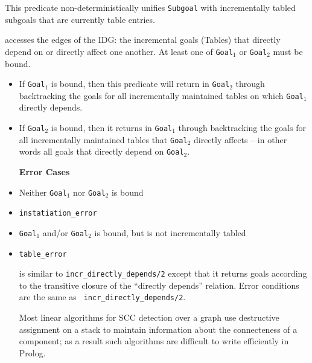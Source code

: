 \begin{description}

%
This predicate non-deterministically unifies {\tt Subgoal} with
incrementally tabled subgoals that are currently table entries.

accesses the edges of the IDG: the incremental goals (Tables) that
directly depend on or directly affect one another.  At least one of
{\tt Goal$_1$} or {\tt Goal$_2$} must be bound.
\begin{itemize}
\item If {\tt Goal$_1$} is bound, then this predicate will return in
  {\tt Goal$_2$} through backtracking the goals for all incrementally
  maintained tables on which {\tt Goal$_1$} directly depends.
\item If {\tt Goal$_2$} is bound, then it returns in {\tt Goal$_1$}
  through backtracking the goals for all incrementally maintained
  tables that {\tt Goal$_2$} directly affects -- in other words all
  goals that directly depend on {\tt Goal$_2$}.  \ei

{\bf Error Cases}
\bi
\item Neither {\tt Goal$_1$} nor {\tt Goal$_2$} is bound 
\bi
\item 	{\tt instatiation\_error}
\ei
\item {\tt Goal$_1$} and/or {\tt Goal$_2$} is bound, but is not
  incrementally tabled
\bi
\item 	{\tt table\_error}
\ei
\ei

is similar to {\tt incr\_directly\_depends/2} except that it returns
goals according to the transitive closure of the ``directly depends''
relation.  Error conditions are the same as {\tt
  incr\_directly\_depends/2}.

%
Most linear algorithms for SCC detection over a graph use destructive
assignment on a stack to maintain information about the connecteness
of a component; as a result such algorithms are
difficult to write efficiently in Prolog.


\end{itemize}
\end{description}
